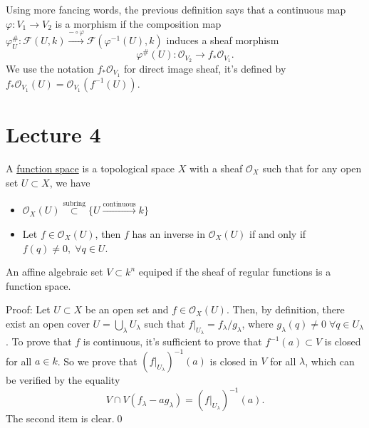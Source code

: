 Using more fancing words, the previous definition says that a continuous map $\varphi:V_1\to V_2$ is a morphism 
if the composition map $\varphi_U^{\#}:\mathcal{F}(U,k)\overset{-\circ\varphi}{\rightarrow}\mathcal{F}(\varphi^{-1}(U),k)$
induces a sheaf morphism 
\begin{equation}
    \varphi^\#(U):\mathcal{O}_{V_2}\to f_*\mathcal{O}_{V_1}.
\end{equation}
We use the notation $f_*\mathcal{O}_{V_1}$ for direct image sheaf, it's defined by 
$f_*\mathcal{O}_{V_1}(U)=\mathcal{O}_{V_1}(f^{-1}(U))$.


\section{Lecture 4}


\begin{dang}
    \begin{definition}
        A \underline{function space} is a topological space $X$ with a sheaf $\mathcal{O}_X$ such that 
        for any open set $U\subset X$, we have 
        \begin{itemize}
            \item[(1)] $\mathcal{O}_X(U)\overset{\text{subring}}{\subset} \{U\overset{\text{continuous}}{\to}k\}$
            \item[(2)] Let $f\in\mathcal{O}_X(U)$, then $f$ has an inverse in $\mathcal{O}_X(U)$ if and only if 
            $f(q)\neq0,\;\forall q\in U$.
        \end{itemize}
    \end{definition}
\end{dang}


\begin{dang}
\begin{lemma}
    An affine algebraic set $V\subset k^n$ equiped if the sheaf of regular functions is a function space.
\end{lemma}
\end{dang}
Proof: Let $U\subset X$ be an open set and $f\in\mathcal{O}_X(U)$. Then, by definition, there exist an open cover 
$U=\bigcup_\lambda U_\lambda$ such that $f|_{U_\lambda}=f_\lambda/g_\lambda$, where $g_\lambda(q)\neq0\;\forall q\in U_\lambda$. 
To prove that $f$ is continuous, it's sufficient to prove that $f^{-1}(a)\subset V$ is closed for all $a\in k$. 
So we prove that $(f|_{U_\lambda})^{-1}(a)$ is closed in $V$ for all $\lambda$, which can be verified by the 
equality
\begin{equation}
    V\cap V(f_\lambda - ag_\lambda) = (f|_{U_\lambda})^{-1}(a).
\end{equation}
The second item is clear.\qed 

